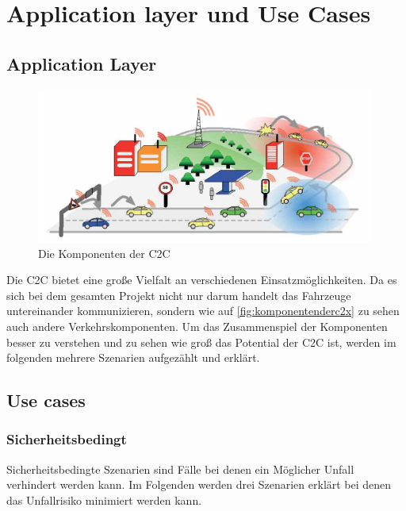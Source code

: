 \chapter{Application layer und Use Cases\label{chap:usecases}}
\section{Application Layer}
\begin{figure}[htbp]
\includegraphics[width=0.99\textwidth]{content/images/06_use_cases/komponenten.png}
\caption{Die Komponenten der \acl{C2C}}
\label{fig:komponentenderc2x}
\end{figure}
Die \acl{C2C} bietet eine große Vielfalt an verschiedenen Einsatzmöglichkeiten. Da es sich bei dem gesamten Projekt nicht nur darum handelt das Fahrzeuge untereinander kommunizieren, sondern wie auf \autoref{fig:komponentenderc2x} zu sehen auch andere Verkehrskomponenten. Um das Zusammenspiel der Komponenten besser zu verstehen und zu sehen wie groß das Potential der \acl{C2C} ist, werden im folgenden mehrere Szenarien aufgezählt und erklärt. 

\section{Use cases}
\subsection{Sicherheitsbedingt}
Sicherheitsbedingte Szenarien sind Fälle bei denen ein Möglicher Unfall verhindert werden kann. Im Folgenden werden drei Szenarien erklärt bei denen das Unfallrisiko minimiert werden kann.
